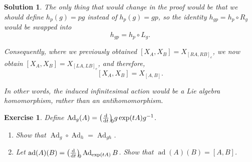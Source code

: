 \documentclass{article}
\newtheorem{ex}{Exercise}
\theoremstyle{nonumberplain}
\newtheorem{sol}{Solution}
\DeclareMathOperator{\Ad}{Ad}
\DeclareMathOperator{\ad}{ad}
\begin{document}
\begin{sol}
The only thing that would change in the proof would be that we should define $h_p(g) = pg$ instead of $h_p(g) = gp$, so the identity $h_{gp} = h_p \circ R_g$ would be swapped into
\[h_{gp} = h_p \circ L_g.\]

Consequently, where we previously obtained $[X_A, X_B] = X_{[RA,RB]_e}$, we now obtain $[X_A, X_B] = X_{[LA,LB]_e}$, and therefore,
\[[X_A,X_B] = X_{[A,B]}.\]

In other words, the induced infinitesimal action would be a Lie algebra homomorphism, rather than an antihomomorphism.
\end{sol}

\begin{ex}
Define $\Ad_g(A) = \diff{}t[0] g \exp(tA) g^{-1}$.

\begin{enumerate}
\item Show that $\Ad_g \circ \Ad_h = \Ad_{gh}$.
\item Let $\ad(A)(B) = \diff{}t[0] \Ad_{\exp(tA)} B$. Show that $\ad(A)(B) = [A,B]$.
\end{enumerate}
\end{ex}
\end{document}
